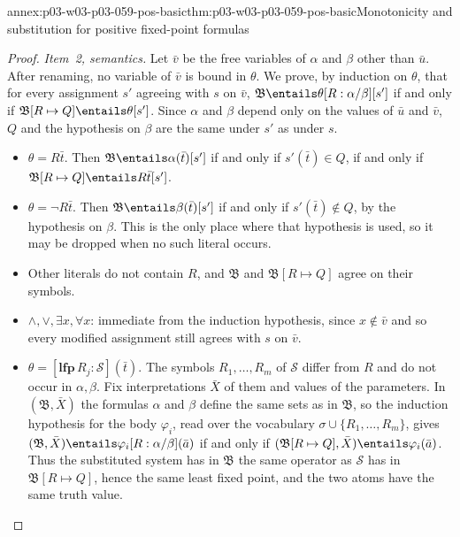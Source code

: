 \begin{annexitem}{annex:p03-w03-p03-059-pos-basic}{thm:p03-w03-p03-059-pos-basic}{Monotonicity and substitution for positive fixed-point formulas}
\begin{proof}
\emph{Item~2, semantics.} Let \(\bar v\) be the free variables of
\(\alpha\) and \(\beta\) other than \(\bar u\). After renaming, no variable
of \(\bar v\) is bound in \(\theta\). We prove, by induction on \(\theta\),
that for every assignment \(s'\) agreeing with \(s\) on \(\bar v\),
\(\mathfrak B\entails\theta[R:\alpha/\beta][s']\) if and only if
\(\mathfrak B[R\mapsto Q]\entails\theta[s']\). Since \(\alpha\) and
\(\beta\) depend only on the values of \(\bar u\) and \(\bar v\), \(Q\) and
the hypothesis on \(\beta\) are the same under \(s'\) as under \(s\).
\begin{itemize}
 \item \(\theta=R\bar t\). Then \(\mathfrak B\entails\alpha(\bar t)[s']\)
       if and only if \(s'(\bar t)\in Q\), if and only if
       \(\mathfrak B[R\mapsto Q]\entails R\bar t[s']\).
 \item \(\theta=\neg R\bar t\). Then \(\mathfrak B\entails\beta(\bar t)[s']\)
       if and only if \(s'(\bar t)\notin Q\), by the hypothesis on
       \(\beta\). This is the only place where that hypothesis is used, so
       it may be dropped when no such literal occurs.
 \item Other literals do not contain \(R\), and \(\mathfrak B\) and
       \(\mathfrak B[R\mapsto Q]\) agree on their symbols.
 \item \(\land,\lor,\exists x,\forall x\): immediate from the induction
       hypothesis, since \(x\notin\bar v\) and so every modified
       assignment still agrees with \(s\) on \(\bar v\).
 \item \(\theta=[\mathbf{lfp}\,R_j:\mathcal S](\bar t)\). The symbols
       \(R_1,\ldots,R_m\) of \(\mathcal S\) differ from \(R\) and do not
       occur in \(\alpha,\beta\). Fix interpretations \(\bar X\) of them and
       values of the parameters. In \((\mathfrak B,\bar X)\) the formulas
       \(\alpha\) and \(\beta\) define the same sets as in \(\mathfrak B\),
       so the induction hypothesis for the body \(\varphi_i\), read over
       the vocabulary \(\sigma\cup\{R_1,\ldots,R_m\}\), gives
       \((\mathfrak B,\bar X)\entails\varphi_i[R:\alpha/\beta](\bar a)\) if
       and only if \((\mathfrak B[R\mapsto Q],\bar X)\entails
       \varphi_i(\bar a)\). Thus the substituted system has in
       \(\mathfrak B\) the same operator as \(\mathcal S\) has in
       \(\mathfrak B[R\mapsto Q]\), hence the same least fixed point, and
       the two atoms have the same truth value.\qedhere
\end{itemize}
\end{proof}
\end{annexitem}

